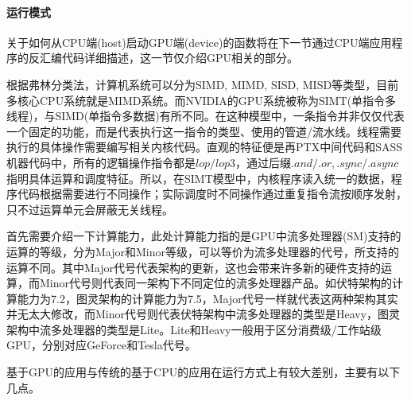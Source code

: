 \paragraph{运行模式}
\par 关于如何从CPU端(host)启动GPU端(device)的函数将在下一节通过CPU端应用程序的反汇编代码详细描述，这一节仅介绍GPU相关的部分。
\par 根据弗林分类法\parencite{FLYNN}，计算机系统可以分为SIMD, MIMD, SISD, MISD等类型，目前多核心CPU系统就是MIMD系统。而NVIDIA的GPU系统被称为SIMT(单指令多线程)，与SIMD(单指令多数据)有所不同。在这种模型中，一条指令并非仅仅代表一个固定的功能，而是代表执行这一指令的类型、使用的管道/流水线。线程需要执行的具体操作需要编写相关内核代码。直观的特征便是再PTX中间代码和SASS机器代码中，所有的逻辑操作指令都是$ lop/lop3 $，通过后缀$ .and/.or, .sync/.async $指明具体运算和调度特征。所以，在SIMT模型中，内核程序读入统一的数据，程序代码根据需要进行不同操作；实际调度时不同操作通过重复指令流按顺序发射，只不过运算单元会屏蔽无关线程。
\par 首先需要介绍一下计算能力，此处计算能力指的是GPU中流多处理器(SM)支持的运算的等级，分为Major和Minor等级，可以等价为流多处理器的代号，所支持的运算不同。其中Major代号代表架构的更新，这也会带来许多新的硬件支持的运算，而Minor代号则代表同一架构下不同定位的流多处理器产品。如伏特架构的计算能力为7.2，图灵架构的计算能力为7.5，Major代号一样就代表这两种架构其实并无太大修改，而Minor代号则代表伏特架构中流多处理器的类型是Heavy，图灵架构中流多处理器的类型是Lite。Lite和Heavy一般用于区分消费级/工作站级GPU，分别对应GeForce和Tesla代号。
\par 基于GPU的应用与传统的基于CPU的应用在运行方式上有较大差别，主要有以下几点。
